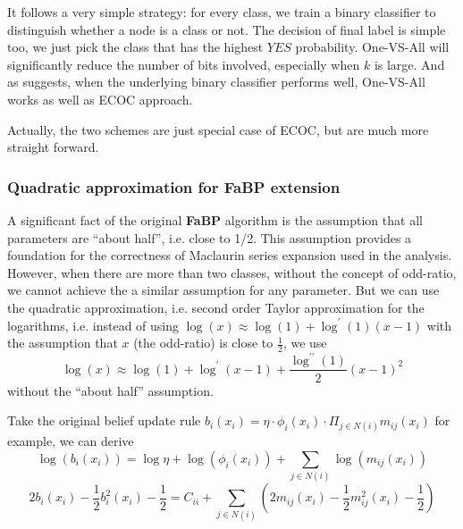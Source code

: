 It follows a very simple strategy: for every class, we train a binary classifier to distinguish whether a node is a class or not. The decision of final label is simple too, we just pick the class that has the highest $YES$ probability. One-VS-All will significantly reduce the number of bits involved, especially when $k$ is large. And as \cite{Ryan2000} suggests, when the underlying binary classifier performs well, One-VS-All works as well as ECOC approach.


Actually, the two schemes are just special case of ECOC, but are much more straight forward.

\subsubsection{Quadratic approximation for FaBP extension}
A significant fact of the original \textbf{FaBP} algorithm is the assumption that all parameters are ``about half'', i.e. close to 1/2. This assumption provides a foundation for the correctness of Maclaurin series expansion used in the analysis. However, when there are more than two classes, without the concept of odd-ratio, we cannot achieve the a similar assumption for any parameter. But we can use the quadratic approximation, i.e. second order Taylor approximation for the logarithms, i.e. instead of using $\log(x) \approx \log(1)+\log^{\prime}(1)(x-1)$ with the assumption that $x$ (the odd-ratio) is close to $\frac{1}{2}$, we use
$$\log(x)\approx \log(1)+\log^{\prime}(x-1)+\frac{\log^{\prime\prime}(1)}{2}(x-1)^2$$
without the ``about half'' assumption.

Take the original belief update rule $b_i(x_i) = \eta\cdot \phi_i(x_i)\cdot\Pi_{j\in N(i)}m_{ij}(x_i)$ for example, we can derive
\begin{equation}
\log(b_i(x_i))=\log\eta + \log(\phi_i(x_i))+ \sum_{j\in N(i)}\log(m_{ij}(x_i))
\end{equation}
\begin{equation}
\label{eq:quadratic approx}
2b_i(x_i)-\frac{1}{2}b_i^2(x_i)-\frac{1}{2}=C_{ii}+\sum_{j\in N(i)}(2m_{ij}(x_i)-\frac{1}{2}m_{ij}^2(x_i)-\frac{1}{2})
\end{equation}

